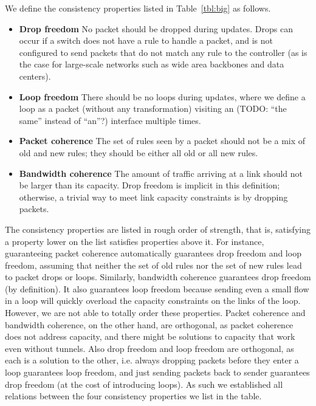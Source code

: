 We define the consistency properties listed in Table~\ref{tbl:big} as follows.

\begin{itemize}

\item
\textbf{Drop freedom} No packet should be dropped during updates. Drops can occur if a switch does not have a rule to handle a packet, and is not configured to send packets that do not match any rule to the controller (as is the case for large-scale networks such as wide area backbones and data centers).

\item
\textbf{Loop freedom} There should be no loops during updates, where we define a loop as a packet (without any transformation) visiting an (TODO: ``the same'' instead of ``an''?) interface multiple times.

\item
\textbf{Packet coherence} The set of rules seen by a packet should not be a mix of old and new rules; they should be either all old or all new rules.

\item
\textbf{Bandwidth coherence} The amount of traffic arriving at a link should not be larger than its capacity. Drop freedom is implicit in this definition; otherwise, a trivial way to meet link capacity constraints is by dropping packets.

\end{itemize}

The consistency properties are listed in rough order of strength, that is, satisfying a property lower on the list satisfies properties above it. For instance, guaranteeing packet coherence automatically guarantees drop freedom and loop freedom, assuming that neither the set of old rules nor the set of new rules lead to packet drops or loops. Similarly, bandwidth coherence guarantees drop freedom (by definition). It also guarantees loop freedom because sending even a small flow in a loop will quickly overload the capacity constraints on the links of the loop.  However, we are not able to totally order these properties. Packet coherence and bandwidth coherence, on the other hand, are orthogonal, as packet coherence does not address capacity, and there might be solutions to capacity that work even without tunnels. Also drop freedom and loop freedom are orthogonal, as each is a solution to the other, i.e. always dropping packets before they enter a loop guarantees loop freedom, and just sending packets back to sender guarantees drop freedom (at the cost of introducing loops). As such we established all relations between the four consistency properties we list in the table.

